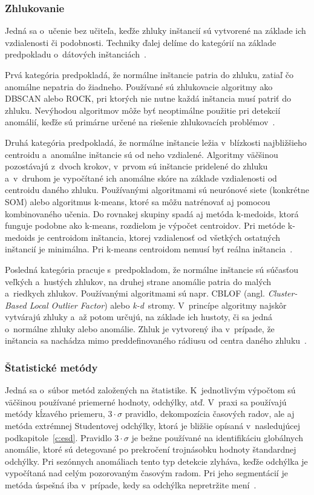 \documentclass[a4paper,twoside,slovak,12pt,appendix]{article}
\begin{document}
\subsubsection{Zhlukovanie}
\label{c:clustering}
Jedná sa o~učenie bez učiteľa, keďže zhluky inštancií sú vytvorené na základe
ich vzdialenosti či podobnosti. Techniky ďalej delíme do kategórií na základe
predpokladu o~dátových inštanciách~\cite{Chandola2009,Tan2005}.

Prvá kategória predpokladá, že normálne inštancie patria do zhluku, zatiaľ čo
anomálne nepatria do žiadneho. Používané sú zhlukovacie algoritmy ako DBSCAN
alebo ROCK, pri ktorých nie nutne každá inštancia musí patriť do zhluku.
Nevýhodou algoritmov môže byť neoptimálne použitie pri detekcií
anomálií, keďže sú primárne určené na riešenie zhlukovacích
problémov~\cite{Chandola2009}.

Druhá kategória predpokladá, že normálne inštancie ležia v~blízkosti
najbližšieho centroidu a~anomálne inštancie sú od neho vzdialené. Algoritmy
väčšinou pozostávajú z~dvoch krokov, v~prvom sú inštancie pridelené do zhluku
a~v~druhom je vypočítané ich anomálne skóre na základe vzdialenosti od centroidu
daného zhluku. Používanými algoritmami sú neurónové siete (konkrétne SOM) alebo
algoritmus k-means, ktoré sa môžu natrénovať aj pomocou kombinovaného učenia. Do
rovnakej skupiny spadá aj metóda k-medoids, ktorá funguje podobne ako k-means,
rozdielom je výpočet centroidov. Pri metóde k-medoids je centroidom inštancia,
ktorej vzdialenosť od všetkých ostatných inštancií je minimálna. Pri k-means
centroidom nemusí byť reálna inštancia~\cite{Chandola2009}.

Posledná kategória pracuje s~predpokladom, že normálne inštancie sú súčasťou
veľkých a~hustých zhlukov, na druhej strane anomálie patria do malých a~riedkych
zhlukov. Používanými algoritmami sú napr. CBLOF
(angl. \textit{Cluster-Based Local Outlier Factor}) alebo \textit{k-d}~stromy.
V~princípe algoritmy najskôr vytvárajú zhluky a~až potom určujú, na základe ich
hustoty, či sa jedná o~normálne zhluky alebo anomálie. Zhluk je vytvorený iba
v~prípade, že inštancia sa nachádza mimo preddefinovaného rádiusu od centra
daného zhluku~\cite{Salvador2005}.

\subsubsection{Štatistické metódy}
Jedná sa o~súbor metód založených na štatistike. K~jednotlivým výpočtom sú
väčšinou používané priemerné hodnoty, odchýlky, atď. V~praxi sa používajú
metódy kĺzavého priemeru, $3\cdot\sigma$ pravidlo, dekompozícia časových radov,
ale aj metóda extrémnej Studentovej odchýlky, ktorá je bližšie opísaná
v~nasledujúcej podkapitole~\ref{c:esd}. Pravidlo $3\cdot\sigma$ je bežne
používané na identifikáciu globálnych anomálie, ktoré sú detegované po
prekročení trojnásobku hodnoty štandardnej odchýlky. Pri sezónnych anomáliach
tento typ detekcie zlyháva, keďže odchýlka je vypočítaná nad celým pozorovaným
časovým radom. Pri jeho segmentácií je metóda úspešná iba v~prípade, kedy sa
odchýlka nepretržite mení~\cite{Hochenbaum2017}.
\end{document}

